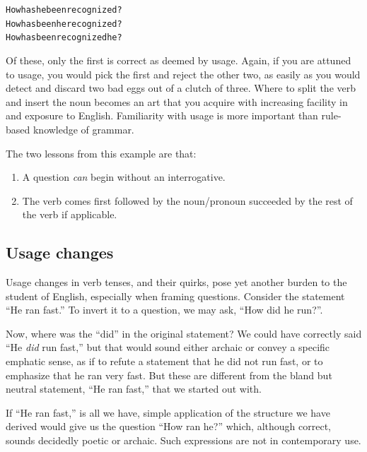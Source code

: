 \documentclass[
  a4paper,
]{article}
\newcommand\pronoun[1]{\textcolor{pronoun}{#1}}
\newcommand\action[1]{\textcolor{action}{#1}}
\begin{document}
\begin{tcolorbox}
\begin{alltt}
\color{normal}
How \action{has} \pronoun{he} \action{been recognized}?
How \action{has been} \pronoun{he} \action{recognized}?
How \action{has been recognized} \pronoun{he}?
\end{alltt}
\end{tcolorbox}

Of these, only the first is correct as deemed by usage. Again, if you
are attuned to usage, you would pick the first and reject the other two,
as easily as you would detect and discard two bad eggs out of a clutch
of three. Where to split the verb and insert the noun becomes an art
that you acquire with increasing facility in and exposure to English.
Familiarity with usage is more important than rule-based knowledge of
grammar.

The two lessons from this example are that:

\begin{enumerate}
\item
  A question \emph{can} begin without an interrogative.
\item
  The verb comes first followed by the noun/pronoun succeeded by the
  rest of the verb if applicable.
\end{enumerate}

\hypertarget{usage-changes}{%
\subsection{Usage changes}\label{usage-changes}}

Usage changes in verb tenses, and their quirks, pose yet another burden
to the student of English, especially when framing questions. Consider
the statement ``He ran fast.'' To invert it to a question, we may ask,
``How did he run?''.

Now, where was the ``did'' in the original statement? We could have
correctly said ``He \emph{did} run fast,'' but that would sound either
archaic or convey a specific emphatic sense, as if to refute a statement
that he did not run fast, or to emphasize that he ran very fast. But
these are different from the bland but neutral statement, ``He ran
fast,'' that we started out with.

If ``He ran fast,'' is all we have, simple application of the structure
we have derived would give us the question ``How ran he?'' which,
although correct, sounds decidedly poetic or archaic. Such expressions
are not in contemporary use.
\end{document}
